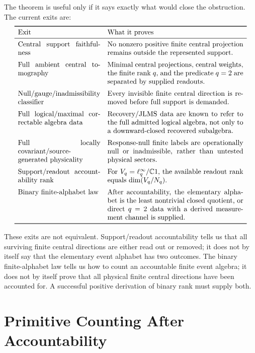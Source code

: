 \documentclass[12pt]{article}
\theoremstyle{definition}
\theoremstyle{remark}
\newcommand{\C}{\mathbb C}
\begin{document}
The theorem is useful only if it says exactly what would close the obstruction.
The current exits are:
\[
\begin{array}{p{0.34\linewidth}p{0.56\linewidth}}
\toprule
Exit & What it proves \\
\midrule
Central support faithfulness &
No nonzero positive finite central projection remains outside the represented
support. \\
\addlinespace
Full ambient central tomography &
Minimal central projections, central weights, the finite rank \(q\), and the
predicate \(q=2\) are separated by supplied readouts. \\
\addlinespace
Null/gauge/inadmissibility classifier &
Every invisible finite central direction is removed before full support is
demanded. \\
\addlinespace
Full logical/maximal correctable algebra data &
Recovery/JLMS data are known to refer to the full admitted logical algebra, not
only to a downward-closed recovered subalgebra. \\
\addlinespace
Full locally covariant/source-generated physicality &
Response-null finite labels are operationally null or inadmissible, rather
than untested physical sectors. \\
\addlinespace
Support/readout accountability rank &
For \(V_q=\ell^\infty_q/\C1\), the available readout rank equals
\(\dim(V_q/N_q)\). \\
\addlinespace
Binary finite-alphabet law &
After accountability, the elementary alphabet is the least nontrivial closed
quotient, or direct \(q=2\) data with a derived measurement channel is supplied. \\
\bottomrule
\end{array}
\]

These exits are not equivalent.  Support/readout accountability tells us that
all surviving finite central directions are either read out or removed; it does
not by itself say that the elementary event alphabet has two outcomes.  The
binary finite-alphabet law tells us how to count an accountable finite event
algebra; it does not by itself prove that all physical finite central
directions have been accounted for.  A successful positive derivation of
binary rank must supply both.

\section{Primitive Counting After Accountability}
\end{document}
